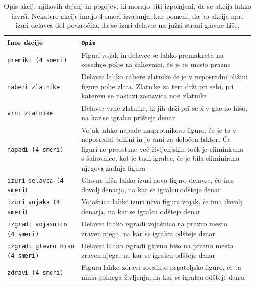 \documentclass[a4paper, 12pt]{book}
\begin{document}
\begin{table}
	\begin{center}
		\begin{tabular}{p{0.3\linewidth}|p{0.7\linewidth}}
			Ime akcije                          & {\tt Opis} \\ \hline
			{\tt premiki (4 smeri)}             & Figuri vojak in delavec se lahko premakneta na sosednje polje na šahovnici, če je to mesto prazno \\
			{\tt naberi zlatnike}               & Delavec lahko nabere zlatnike če je v neposredni bližini figure polje zlata. Zlatnike za tem drži pri sebi, pri katerem se nastavi zastavica nosi zlatnike\\
			{\tt vrni zlatnike}                 & Delavec vrne zlatnike, ki jih drži pri sebi v glavno hišo, na kar se igralcu prišteje denar \\
			{\tt napadi (4 smeri)}              & Vojak lahko napade nasprotnikovo figuro, če je ta v neposredni bližini in jo rani za določen faktor. Če figuri ne preostane več življenjskih točk je eliminirana s šahovnice, kot je tudi igralec, če je bila eliminirana njegova zadnja figura \\
			{\tt izuri delavca (4 smeri)}       & Glavna hiša lahko izuri novo figuro delavec, če ima dovolj denarja, na kar se igralcu odšteje denar\\
			{\tt izuri vojaka (4 smeri)}        & Vojašnica lahko izuri novo figuro vojak, če ima dovolj denarja, na kar se igralcu odšteje denar \\
			{\tt izgradi vojašnico (4 smeri)}   & Delavec lahko izgradi vojašnico na prazno mesto zraven njega, na kar se igralcu odšteje denar \\
			{\tt izgradi glavno hišo (4 smeri)} & Delavec lahko izgradi glavno hišo na prazno mesto zraven njega, na kar se igralcu odšteje denar \\
			{\tt zdravi (4 smeri)}              & Figura lahko zdravi sosednjo prijateljsko figuro, če ta nima polnega življenja, na kar se igralcu odšteje denar\\
		\end{tabular}
	\end{center}
	\caption{Opis akcij, njihovih dejanj in pogojev, ki morajo biti izpolnjeni, da se akcija lahko izvrši. Nekatere akcije imajo 4 smeri izvajanja, kar pomeni, da bo akcija npr. izuri delavca dol povzročila, da se izuri delavec na južni strani glavne hiše.}
	\label{tableActions}
\end{table}
\end{document}
